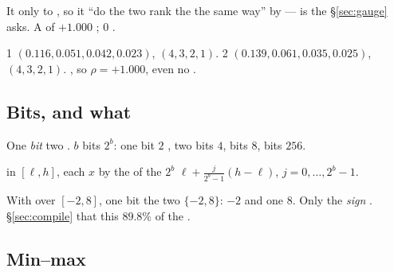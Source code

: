  It  only to \emph{},
so it  ``do the two  rank the  the same way'' 
  by    ---  is the  
§\ref{sec:gauge} asks. A  of $+1.000$   ; $0$ 
 .

  1  $(0.116, 0.051, 0.042, 0.023)$, 
$(4,3,2,1)$.  2  $(0.139,0.061,0.035,0.025)$,  $(4,3,2,1)$.
 , so $\rho=+1.000$, even  no  .

\subsection{Bits, and what  }

\begin{definition}[Bit]
One \emph{bit}  two . $b$ bits  $2^b$: one
bit  $2$ , two bits $4$,  bits $8$,  bits $256$.
\end{definition}

\begin{definition}
  in $[\ell,h]$,  each $x$ by the  of the $2^b$ 
  $\ell + \tfrac{j}{2^b-1}(h-\ell)$, $j=0,\dots,2^b-1$.
\end{definition}

 With   over $[-2,8]$, one bit  the
two  $\{-2, 8\}$:     $-2$ and   one
$8$. Only the \emph{sign} . §\ref{sec:compile}  that this
 $89.8\%$ of the  .

\subsection{Min--max }

